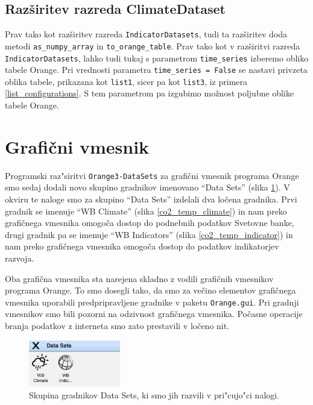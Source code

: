 \subsection{Razširitev razreda ClimateDataset}
\label{razsiritev_razreda_climatedataset}

Prav tako kot razširitev razreda \verb|IndicatorDatasets|, tudi ta razširitev
doda metodi \verb|as_numpy_array| in \verb|to_orange_table|. Prav tako kot v
razširitvi razreda \verb|IndicatorDatasets|, lahko tudi tukaj s parametrom
\verb|time_series| izberemo obliko tabele Orange. Pri vrednosti parametra 
\verb|time_series = False| se nastavi privzeta oblika tabele, prikazana kot
\verb|list1|, sicer pa kot \verb|list3|, iz primera \ref{list_configurations}.
S tem parametrom pa izgubimo možnost poljubne oblike tabele Orange.


\section{Grafični vmesnik}

Programski raz"siritvi \verb|Orange3-DataSets| za 
grafični vmesnik programa Orange smo sedaj dodali novo skupino gradnikov imenovano
``Data Sets'' (slika \ref{data_sets_group}). V okviru te naloge smo za skupino
``Data Sets'' izdelali dva ločena gradnika. Prvi gradnik se imenuje ``WB
Climate'' (slika \ref{co2_temp_climate}) in nam preko grafičnega vmesnika 
omogoča dostop do podnebnih podatkov Svetovne banke, drugi gradnik pa se 
imenuje ``WB Indicators'' (slika \ref{co2_temp_indicator}) in nam
preko grafičnega vmesnika omogoča dostop do podatkov indikatorjev razvoja.

Oba grafična vmesnika sta narejena skladno z vodili grafičnih vmesnikov
programa Orange. To smo dosegli tako, da smo za večino elementov grafičnega
vmesnika uporabili predpripravljene gradnike v paketu \verb|Orange.gui|. Pri
gradnji vmesnikov smo bili pozorni na odzivnost grafičnega vmesnika.
Počasne operacije branja podatkov z interneta smo zato prestavili v ločeno nit.
 
\begin{figure}
  \begin{center}
    \includegraphics[width=4cm]{pic/data_sets_group.png}
  \end{center}
  \caption{Skupina gradnikov Data Sets, ki smo jih razvili v pri"cujo"ci nalogi.}
  \label{data_sets_group}
\end{figure} 


